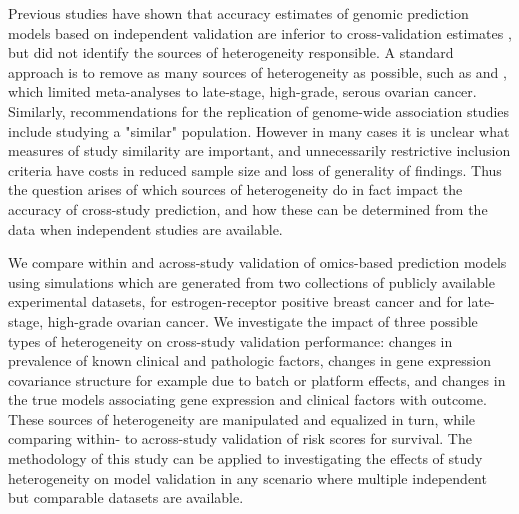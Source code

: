 \documentclass{bioinfo}
\begin{document}
Previous studies have shown that accuracy estimates of genomic
prediction models based on independent validation are inferior to
cross-validation estimates \citep{Castaldi2011-dl, Bernau2014}, but
did not identify the sources of heterogeneity responsible.  A standard
approach is to remove as many sources of heterogeneity as possible,
such as \citet{Waldron2014} and \citet{Riester2014}, which limited
meta-analyses to late-stage, high-grade, serous ovarian
cancer. Similarly, recommendations for the replication of genome-wide
association studies include studying a "similar" population.
However in many cases it is unclear what measures of study similarity are
important, and unnecessarily restrictive inclusion criteria have costs
in reduced sample size and loss of generality of findings.
Thus the question arises of which sources of heterogeneity do in fact
impact the accuracy of cross-study prediction, and how these can be
determined from the data when independent studies are available.

We compare within and across-study validation of omics-based prediction models
using simulations which are generated from two collections of publicly
available experimental datasets, for estrogen-receptor positive breast cancer 
and for late-stage, high-grade ovarian cancer. %
We investigate the impact of three possible types of heterogeneity on cross-study
validation performance: changes in prevalence of known clinical and
pathologic factors, changes in gene expression covariance structure
for example due to batch or platform effects, and changes in the true
models associating gene expression and clinical factors with outcome.  
These sources of heterogeneity are manipulated and equalized in turn, 
while comparing within- to across-study validation of risk scores for 
survival. The methodology of this study can be applied to
investigating the effects of study heterogeneity on model validation
in any scenario where multiple independent but comparable datasets are available.


\end{document}
